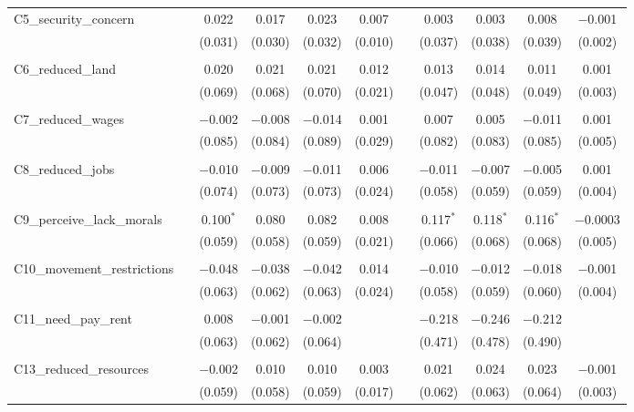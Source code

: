 \begin{table}[H]
\begin{tabular}{@{\extracolsep{4pt}}lcccccccccc}
 C5\_security\_concern &  & 0.022 & 0.017 & 0.023 & 0.007 &  & 0.003 & 0.003 & 0.008 & $-$0.001 \\ 
  &  & (0.031) & (0.030) & (0.032) & (0.010) &  & (0.037) & (0.038) & (0.039) & (0.002) \\ 
  & & & & & & & & & & \\ 
 C6\_reduced\_land &  & 0.020 & 0.021 & 0.021 & 0.012 &  & 0.013 & 0.014 & 0.011 & 0.001 \\ 
  &  & (0.069) & (0.068) & (0.070) & (0.021) &  & (0.047) & (0.048) & (0.049) & (0.003) \\ 
  & & & & & & & & & & \\ 
 C7\_reduced\_wages &  & $-$0.002 & $-$0.008 & $-$0.014 & 0.001 &  & 0.007 & 0.005 & $-$0.011 & 0.001 \\ 
  &  & (0.085) & (0.084) & (0.089) & (0.029) &  & (0.082) & (0.083) & (0.085) & (0.005) \\ 
  & & & & & & & & & & \\ 
 C8\_reduced\_jobs &  & $-$0.010 & $-$0.009 & $-$0.011 & 0.006 &  & $-$0.011 & $-$0.007 & $-$0.005 & 0.001 \\ 
  &  & (0.074) & (0.073) & (0.073) & (0.024) &  & (0.058) & (0.059) & (0.059) & (0.004) \\ 
  & & & & & & & & & & \\ 
 C9\_perceive\_lack\_morals &  & 0.100$^{*}$ & 0.080 & 0.082 & 0.008 &  & 0.117$^{*}$ & 0.118$^{*}$ & 0.116$^{*}$ & $-$0.0003 \\ 
  &  & (0.059) & (0.058) & (0.059) & (0.021) &  & (0.066) & (0.068) & (0.068) & (0.005) \\ 
  & & & & & & & & & & \\ 
 C10\_movement\_restrictions &  & $-$0.048 & $-$0.038 & $-$0.042 & 0.014 &  & $-$0.010 & $-$0.012 & $-$0.018 & $-$0.001 \\ 
  &  & (0.063) & (0.062) & (0.063) & (0.024) &  & (0.058) & (0.059) & (0.060) & (0.004) \\ 
  & & & & & & & & & & \\ 
 C11\_need\_pay\_rent &  & 0.008 & $-$0.001 & $-$0.002 &  &  & $-$0.218 & $-$0.246 & $-$0.212 &  \\ 
  &  & (0.063) & (0.062) & (0.064) &  &  & (0.471) & (0.478) & (0.490) &  \\ 
  & & & & & & & & & & \\ 
 C13\_reduced\_resources &  & $-$0.002 & 0.010 & 0.010 & 0.003 &  & 0.021 & 0.024 & 0.023 & $-$0.001 \\ 
  &  & (0.059) & (0.058) & (0.059) & (0.017) &  & (0.062) & (0.063) & (0.064) & (0.003) \\ 

\end{tabular}
\end{table}
